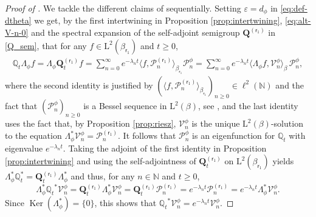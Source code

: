 \documentclass[JEP,XML,SOM,Unicode]{cedram}
\let\epsilon\varepsilon
\theoremstyle{plain}
\theoremstyle{definition}
\DeclareMathOperator{\Ker}{Ker}
\newcommand{\N}{\mathbb{N}}
\renewcommand{\P}{\mathcal{P}}
\newcommand{\V}{\mathcal{V}}
\newcommand{\J}{\mathds{Q}}
\newcommand{\Leb}{\mathrm{L}}
\newcommand{\lam}{{\bm{\lambda}_1}}
\newcommand{\vat}{{\mathsf{r}_1}}
\newcommand{\Q}[1][\mo]{\mathbf{Q}^{({#1})}}
\newcommand{\gab}[1][\lam,\mo]{{\beta_{#1}}}
\let\mo\mu
\let\bpsi\beta
\begin{document}
\begin{proof}[Proof of ]
We tackle the different claims of  sequentially. Setting $\epsilon = d_\phi$ in \eqref{eq:def-dtheta} we get, by the first intertwining in Proposition \ref{prop:intertwining}, \eqref{eq:alt-V-n-0}
and the spectral expansion of the self-adjoint semigroup $\Q[\vat]$ in \eqref{Q_sem}, that for any $f \in \Leb^2(\gab[\vat])$ and $t \geq 0$,
\begin{align*}
\J_t \Lambda_\phi f = \Lambda_\phi \Q[\vat]_t f = \sum_{n=0}^\infty e^{-\lambda_n t} \langle f, \P_n^{(\vat)} \rangle_{\gab[\vat]} \P_n^\phi = \sum_{n=0}^\infty e^{-\lambda_n t} \langle \Lambda_\phi f, \V_n^\phi \rangle_{\bpsi}\, \P_n^\phi,
\end{align*}
where the second identity is justified by $(\langle f, \P_n^{(\vat)}\rangle_{\gab[\vat]})_{n \geq 0} \in \ell^2(\N)$ and the fact that $(\P_n^\phi)_{n \geq 0}$ is a Bessel sequence in $\Leb^2(\bpsi)$, see \cite[Th.\,3.1.3]{Christensen2003a}, and the last identity uses the fact that, by Proposition \ref{prop:riesz}, $\V_n^\phi$ is the unique $\Leb^2(\bpsi)$-solution to the equation $\Lambda_\phi^* \V_n^\phi = \P_n^{(\vat)}$. It follows that $\P_n^\phi$ is an eigenfunction for $\J_t$ with eigenvalue $e^{-\lambda_n t}$. Taking the adjoint of the first identity in Proposition \ref{prop:intertwining}
and using the self-adjointness of $\Q[\vat]_t$ on $\Leb^2(\gab[\vat])$ yields $\Lambda_\phi^* \J_t^* = \Q[\vat]_t \Lambda_\phi^*$ and thus, for any $n \in \N$ and $t \geq 0$,
\begin{equation*}
\Lambda_\phi^* {\J_t}^* \V_n^\phi = \Q[\vat]_t \Lambda_\phi^* \V_n^\phi = \Q[\vat]_t \P_n^{(\vat)} = e^{-\lambda_n t} \P_n^{(\vat)} = e^{-\lambda_n t}\Lambda_\phi^* \V_n^\phi.
\end{equation*}
Since $\Ker(\Lambda_\phi^*) = \{0\}$, this shows that ${\J_t}^* \V_n^\phi = e^{-\lambda_n t} \V_n^\phi$.


\end{proof}
\end{document}
